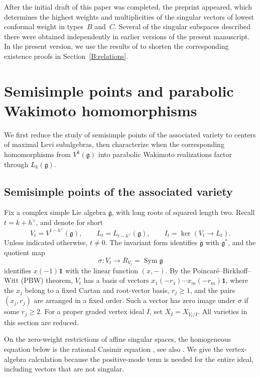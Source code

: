 \documentclass[11pt,a4paper]{amsart}
\numberwithin{equation}{section}
\theoremstyle{definition}
\theoremstyle{remark}
\newcommand{\g}{\mathfrak g}
\newcommand{\Sym}{\operatorname{Sym}}
\begin{document}
After the initial draft of this paper was completed, the preprint
\cite{JiangWu2026} appeared, which determines the highest weights and
multiplicities of the singular vectors of lowest conformal weight
in types~$B$ and~$C$. Several of the singular subspaces described
there were obtained independently in earlier versions of the
present manuscript.
In the present version, we use the results of \cite{JiangWu2026}
to shorten the corresponding existence proofs in
Section~\ref{B:relations}. 






\section{Semisimple points and parabolic Wakimoto homomorphisms}\label{com:centers}
We first reduce the study of semisimple points of the associated variety to centers of maximal Levi subalgebras, then characterize when the corresponding homomorphisms from $V^k(\g)$ into parabolic Wakimoto realizations factor through $L_k(\g)$.

\subsection{Semisimple points of the associated variety}
Fix a complex simple Lie algebra $\g$, with long roots of squared length
two. Recall $t=k+h^\vee$, and denote for short
\begin{equation}
    V_t=V^{t-h^\vee}(\g),\qquad L_t=L_{t-h^\vee}(\g),\qquad I_t=\ker(V_t\to L_t).
\end{equation}
Unless indicated otherwise, $t\ne0$. The invariant form identifies
$\g$ with $\g^*$, and the quotient map
$$
 \sigma:V_t\longrightarrow R_{V_t}=\Sym\g
$$
identifies $x(-1)\mathbf1$ with the linear function $(x,-)$.
By the Poincar\'e--Birkhoff--Witt (PBW) theorem, $V_t$ has a basis of
vectors $x_1(-r_1)\cdots x_m(-r_m)\mathbf1$, where the $x_j$
belong to a fixed Cartan and root-vector basis, $r_j\ge1$, and the
pairs $(x_j,r_j)$ are arranged in a fixed order.
Such a vector has zero image under $\sigma$ if some $r_j\ge2$. For a proper graded vertex ideal $I$, set
$X_I=X_{V_t/I}$. All varieties in this section are reduced.

On the zero-weight restrictions of affine singular spaces, the
homogeneous equation below is the rational Casimir equation
\cite[Theorem~2.1]{FMTV2000}, see also \cite{MillsonToledanoLaredo2005}.
We give the vertex-algebra calculation because the positive-mode term
is needed for the entire ideal, including vectors that are not singular.
\end{document}
